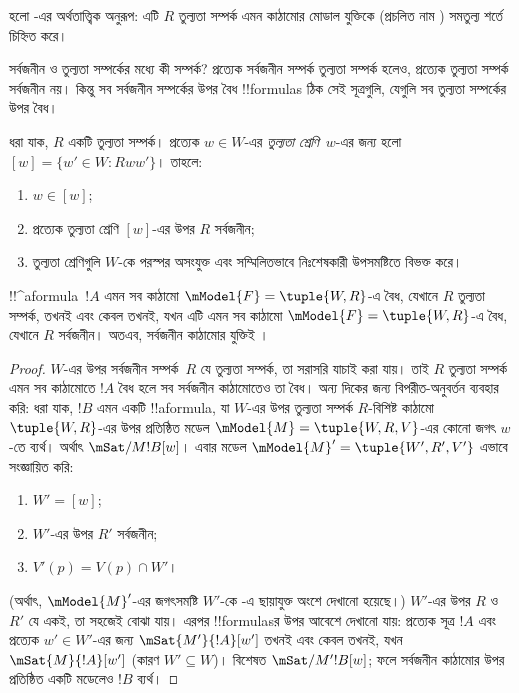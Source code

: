 \documentclass[../../../include/open-logic-section]{subfiles}
\begin{document}
 হলো -এর অর্থতাত্ত্বিক অনুরূপ: এটি $R$ তুল্যতা সম্পর্ক এমন কাঠামোর মোডাল যুক্তিকে (প্রচলিত নাম ) সমতুল্য শর্তে চিহ্নিত করে।

সর্বজনীন ও তুল্যতা সম্পর্কের মধ্যে কী সম্পর্ক? প্রত্যেক সর্বজনীন সম্পর্ক তুল্যতা সম্পর্ক হলেও, প্রত্যেক তুল্যতা সম্পর্ক সর্বজনীন নয়। কিন্তু সব সর্বজনীন সম্পর্কের উপর বৈধ !!{formula}s ঠিক সেই সূত্রগুলি, যেগুলি সব তুল্যতা সম্পর্কের উপর বৈধ।

\begin{prop}
  ধরা যাক, $R$ একটি তুল্যতা সম্পর্ক। প্রত্যেক $w \in W$-এর \emph{তুল্যতা শ্রেণি}~$w$-এর জন্য হলো $[w] = \{w'\in W :
  Rww'\}$। তাহলে:
  \begin{enumerate}
  \item $w \in [w]$;
  \item প্রত্যেক তুল্যতা শ্রেণি $[w]$-এর উপর $R$ সর্বজনীন;
  \item তুল্যতা শ্রেণিগুলি $W$-কে পরস্পর অসংযুক্ত এবং সম্মিলিতভাবে নিঃশেষকারী উপসমষ্টিতে বিভক্ত করে।
  \end{enumerate}
\end{prop}

\begin{prop}
  !!^a{formula}~$!A$ এমন সব কাঠামো $\mModel{F} =\tuple{W,R}$-এ বৈধ, যেখানে $R$ তুল্যতা সম্পর্ক, তখনই এবং কেবল তখনই, যখন এটি এমন সব কাঠামো $\mModel{F} =\tuple{W,R}$-এ বৈধ, যেখানে $R$ সর্বজনীন। অতএব, সর্বজনীন কাঠামোর যুক্তিই ।
\end{prop}

\begin{proof}
  $W$-এর উপর সর্বজনীন সম্পর্ক~$R$ যে তুল্যতা সম্পর্ক, তা সরাসরি যাচাই করা যায়। তাই $R$ তুল্যতা সম্পর্ক এমন সব কাঠামোতে $!A$ বৈধ হলে সব সর্বজনীন কাঠামোতেও তা বৈধ। অন্য দিকের জন্য বিপরীত-অনুবর্তন ব্যবহার করি: ধরা যাক, $!B$ এমন একটি !!a{formula}, যা $W$-এর উপর তুল্যতা সম্পর্ক $R$-বিশিষ্ট কাঠামো $\tuple{W,R}$-এর উপর প্রতিষ্ঠিত মডেল $\mModel{M} = \tuple{W, R, V}$-এর কোনো জগৎ $w$-তে ব্যর্থ। অর্থাৎ $\mSat/{M}{!B}[w]$। এবার মডেল $\mModel{M}' = \tuple{W',
    R', V'}$ এভাবে সংজ্ঞায়িত করি:
  \begin{enumerate}
  \item $W' = [w]$;
  \item $W'$-এর উপর $R'$ সর্বজনীন;
  \item $V'(p) = V(p) \cap W'$।
  \end{enumerate}
  (অর্থাৎ, $\mModel{M}'$-এর জগৎসমষ্টি $W'$-কে -এ ছায়াযুক্ত অংশে দেখানো হয়েছে।) $W'$-এর উপর $R$ ও $R'$ যে একই, তা সহজেই বোঝা যায়। এরপর !!{formula}sর উপর আবেশে দেখানো যায়: প্রত্যেক সূত্র $!A$ এবং প্রত্যেক $w' \in W'$-এর জন্য $\mSat{M'}{!A}[w']$ তখনই এবং কেবল তখনই, যখন $\mSat{M}{!A}[w']$ (কারণ $W'
  \subseteq W$)। বিশেষত $\mSat/{M'}{!B}[w]$; ফলে সর্বজনীন কাঠামোর উপর প্রতিষ্ঠিত একটি মডেলেও $!B$ ব্যর্থ।
\end{proof}
\end{document}
